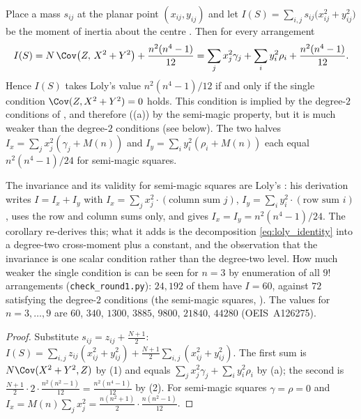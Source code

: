 \begin{corollary}
\label{cor:loly}
Place a mass $s_{ij}$ at the planar point $(x_{ij},y_{ij})$ and let
$I(S)=\sum_{i,j}s_{ij}\bigl(x_{ij}^{2}+y_{ij}^{2}\bigr)$ be the moment of inertia about the centre \cite{loly2004invariance}.
Then for every arrangement
\begin{equation}
I(S)=N\,\Cov\bigl(Z,\,X^{2}+Y^{2}\bigr)+\frac{n^{2}(n^{4}-1)}{12}
=\sum_j x_j^{2}\gamma_j+\sum_i y_i^{2}\rho_i+\frac{n^{2}(n^{4}-1)}{12}.
\label{eq:loly_identity}
\end{equation}
Hence $I(S)$ takes Loly's value $n^{2}(n^{4}-1)/12$ if and only if the single condition $\Cov(Z,X^{2}+Y^{2})=0$ holds.
This condition is implied by the degree-$2$ conditions of , and therefore ((a)) by the
semi-magic property, but it is much weaker than the degree-$2$ conditions (see below).
The two halves $I_x=\sum_jx_j^{2}(\gamma_j+M(n))$ and $I_y=\sum_iy_i^{2}(\rho_i+M(n))$ each equal $n^{2}(n^{4}-1)/24$ for
semi-magic squares.
\end{corollary}

The invariance and its validity for semi-magic squares are Loly's \cite{loly2004invariance}: his derivation writes
$I=I_x+I_y$ with $I_x=\sum_jx_j^{2}\cdot(\text{column sum }j)$, $I_y=\sum_iy_i^{2}\cdot(\text{row sum }i)$, uses the row and
column sums only, and gives $I_x=I_y=n^{2}(n^{4}-1)/24$.  The corollary re-derives this; what it adds is the decomposition
\eqref{eq:loly_identity} into a degree-two cross-moment plus a constant, and the observation that the invariance is one scalar
condition rather than the degree-two level.  How much weaker the single condition is can be seen for $n=3$ by enumeration
of all $9!$ arrangements (\texttt{check\_round1.py}): $24{,}192$ of them have $I=60$, against $72$ satisfying the
degree-$2$ conditions (the semi-magic squares, ).  The values for $n=3,\dots,9$ are $60$, $340$, $1300$, $3885$, $9800$, $21840$,
$44280$ (OEIS~A126275).

\begin{proof}
Substitute $s_{ij}=z_{ij}+\frac{N+1}2$:
$I(S)=\sum_{i,j}z_{ij}(x_{ij}^{2}+y_{ij}^{2})+\frac{N+1}2\sum_{i,j}(x_{ij}^{2}+y_{ij}^{2})$.
The first sum is $N\Cov(X^{2}+Y^{2},Z)$ by (1) and equals
$\sum_jx_j^{2}\gamma_j+\sum_iy_i^{2}\rho_i$ by (a); the second is
$\frac{N+1}2\cdot2\cdot\frac{n^{2}(n^{2}-1)}{12}=\frac{n^{2}(n^{4}-1)}{12}$ by (2).
For semi-magic squares $\gamma=\rho=0$ and $I_x=M(n)\sum_jx_j^{2}=\frac{n(n^{2}+1)}2\cdot\frac{n(n^{2}-1)}{12}$.
\end{proof}

